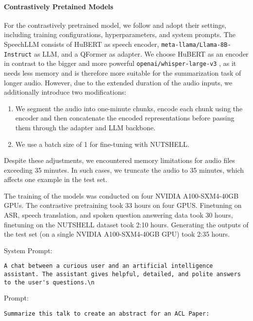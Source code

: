 \paragraph{Contrastively Pretained Models}
For the contrastively pretrained model, we follow \citet{züfle2024contrastivelearningtaskindependentspeechllmpretraining} and adopt their settings, including training configurations, hyperparameters, and system prompts. The SpeechLLM consists of HuBERT \citep{hubert-2021} as speech encoder, \texttt{meta\--llama/\-Llama\--8B\--Instruct} as LLM, and a QFormer \citep{Li2023BLIP2BL} as adapter. We choose HuBERT as an encoder in contrast to the bigger and more powerful \texttt{openai/\-whisper-\-large-\-v3} \citep{radford2022robustspeechrecognitionlargescale}, as it needs less memory and is therefore more suitable for the summarization task of longer audio. 
However, due to the extended duration of the audio inputs, we additionally introduce two modifications:
\begin{enumerate}
    \item     We segment the audio into one-minute chunks, encode each chunk using the encoder and then concatenate the encoded representations before passing them through the adapter and LLM backbone.
    \item     We use a batch size of 1 for fine-tuning with NUTSHELL.
\end{enumerate}

Despite these adjustments, we encountered memory limitations for audio files exceeding 35 minutes. In such cases, we truncate the audio to 35 minutes, which affects one example in the test set.

The training of the models was conducted on four NVIDIA A100-SXM4-40GB GPUs. The contrastive pretraining took 33 hours on four GPUS. Finetuning on ASR, speech translation, and spoken question answering data took 30 hours, finetuning on the NUTSHELL dataset took 2:10 hours.
Generating the outputs of the test set (on a single NVIDIA A100-SXM4-40GB GPU) took 2:35 hours.

\noindent System Prompt:
\begin{lstlisting}[breaklines=true, breakindent=0pt]
A chat between a curious user and an artificial intelligence assistant. The assistant gives helpful, detailed, and polite answers to the user's questions.\n
\end{lstlisting}
Prompt:
\begin{lstlisting}[breaklines=true, breakindent=0pt]
Summarize this talk to create an abstract for an ACL Paper:
\end{lstlisting}

